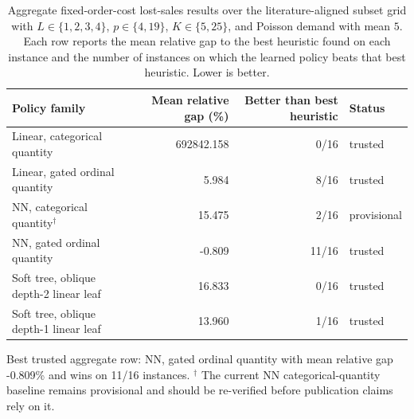 \begin{table}[!htbp]
\centering
\caption{Aggregate fixed-order-cost lost-sales results over the literature-aligned subset grid with $L \in \{1,2,3,4\}$, $p \in \{4,19\}$, $K \in \{5,25\}$, and Poisson demand with mean $5$. Each row reports the mean relative gap to the best heuristic found on each instance and the number of instances on which the learned policy beats that best heuristic. Lower is better.}
\label{tab:fixed-cost-full-grid}
\begin{tabular}{lrrl}
\toprule
Policy family & Mean relative gap (\%) & Better than best heuristic & Status \\
\midrule
Linear, categorical quantity & 692842.158 & 0/16 & trusted \\
Linear, gated ordinal quantity & 5.984 & 8/16 & trusted \\
NN, categorical quantity$^{\dagger}$ & 15.475 & 2/16 & provisional \\
NN, gated ordinal quantity & -0.809 & 11/16 & trusted \\
Soft tree, oblique depth-2 linear leaf & 16.833 & 0/16 & trusted \\
Soft tree, oblique depth-1 linear leaf & 13.960 & 1/16 & trusted \\
\bottomrule
\end{tabular}
\par\medskip\footnotesize{Best trusted aggregate row: NN, gated ordinal quantity with mean relative gap -0.809\% and wins on 11/16 instances. $^{\dagger}$ The current NN categorical-quantity baseline remains provisional and should be re-verified before publication claims rely on it.}
\end{table}
